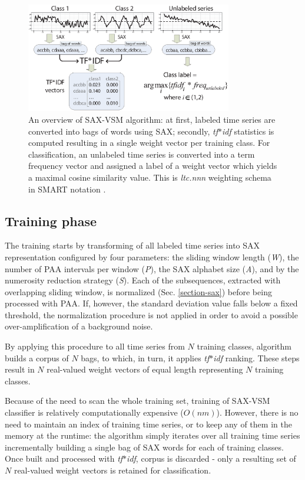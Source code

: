 \documentclass[conference]{IEEEtran}
\begin{document}
\begin{figure}[t]
   \centering
   \includegraphics[width=90mm]{figures/overview.eps}
   \caption{
   An overview of SAX-VSM algorithm: 
   at first, labeled time series are converted into bags of words using SAX; 
   secondly, \textit{tf$\ast$idf} statistics is computed resulting in 
   a single weight vector per training class. For classification, an unlabeled 
   time series is converted into a term frequency vector and assigned a 
   label of a weight vector which yields a maximal cosine similarity value.
   This is \textit{ltc.nnn} weighting schema in SMART notation \cite{logtf}.}
   \label{fig:overview}
\end{figure}

\subsection{Training phase}
The training starts by transforming of all labeled time series into SAX representation
configured by four parameters: 
the sliding window length (\textit{W}), 
the number of PAA intervals per window (\textit{P}), 
the SAX alphabet size (\textit{A}), 
and by the numerosity reduction strategy (\textit{S}).
Each of the subsequences, extracted with overlapping sliding window, 
is normalized (Sec. \ref{section-sax}) before being processed with PAA. 
If, however, the standard deviation value falls below a fixed threshold, the 
normalization procedure is not applied in order to avoid a possible 
over-amplification of a background noise. 

By applying this procedure to all time series from $N$ training classes, 
algorithm builds a corpus of $N$ bags, to which, in turn, 
it applies \textit{tf$\ast$idf} ranking. 
These steps result in $N$ real-valued weight vectors of equal length 
representing $N$ training classes. 

Because of the need to scan the whole training set, training of SAX-VSM 
classifier is relatively computationally expensive ($O(nm)$). 
However, there is no need to maintain an index of training time series, 
or to keep any of them in the memory at the runtime: 
the algorithm simply iterates over all training time series incrementally building 
a single bag of SAX words for each of training classes. 
Once built and processed with \textit{tf$\ast$idf}, corpus is discarded - 
only a resulting set of $N$ real-valued weight vectors is retained for classification. 
\end{document}
